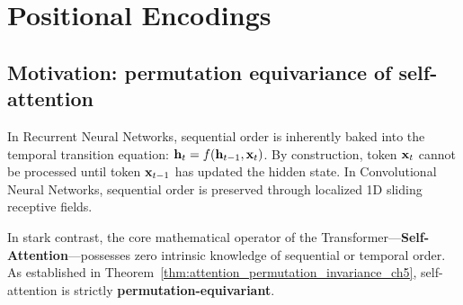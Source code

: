 \documentclass[../../main.tex]{subfiles}
\begin{document}
\clearpage
\section{Positional Encodings}
\label{sec:positional_representations_taxonomy}

\subsection{Motivation: permutation equivariance of self-attention}
\label{subsec:pe_motivation_permutation}

In Recurrent Neural Networks, sequential order is inherently baked into the temporal transition equation: $\mathbf{h}_t = f(\mathbf{h}_{t-1}, \mathbf{x}_t)$. By construction, token $\mathbf{x}_t$ cannot be processed until token $\mathbf{x}_{t-1}$ has updated the hidden state. In Convolutional Neural Networks, sequential order is preserved through localized 1D sliding receptive fields.

In stark contrast, the core mathematical operator of the Transformer---\textbf{Self-Attention}---possesses zero intrinsic knowledge of sequential or temporal order. As established in Theorem~\ref{thm:attention_permutation_invariance_ch5}, self-attention is strictly \textbf{permutation-equivariant}.
\end{document}
